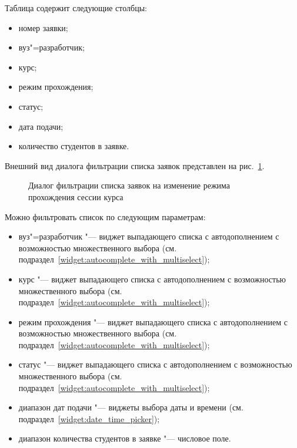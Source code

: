 Таблица содержит следующие столбцы:
\begin{itemize}
	\item номер заявки;
	\item вуз"=разработчик;
	\item курс;
	\item режим прохождения;
	\item статус;
	\item дата подачи;
	\item количество студентов в заявке.
\end{itemize}

Внешний вид диалога фильтрации списка заявок представлен на рис.~\ref{img:student:change_mode_req_list_filter}.
\begin{figure}[H]
	\caption{Диалог фильтрации списка заявок на изменение режима прохождения сессии курса}
	\label{img:student:change_mode_req_list_filter}
\end{figure}

Можно фильтровать список по следующим параметрам:
\begin{itemize}
	\item вуз"=разработчик "--- виджет выпадающего списка с автодополнением с возможностью множественного выбора 
	(см. подраздел~\ref{widget:autocomplete_with_multiselect});
	\item курс "--- виджет выпадающего списка с автодополнением с возможностью множественного выбора 
	(см. подраздел~\ref{widget:autocomplete_with_multiselect});
	\item режим прохождения "--- виджет выпадающего списка с автодополнением с возможностью множественного выбора 
	(см. подраздел~\ref{widget:autocomplete_with_multiselect});
	\item статус "--- виджет выпадающего списка с автодополнением с возможностью множественного выбора 
	(см. подраздел~\ref{widget:autocomplete_with_multiselect});
	\item диапазон дат подачи "--- виджеты выбора даты и времени 
	(см. подраздел~\ref{widget:date_time_picker});
	\item диапазон количества студентов в заявке "--- числовое поле.
\end{itemize}

